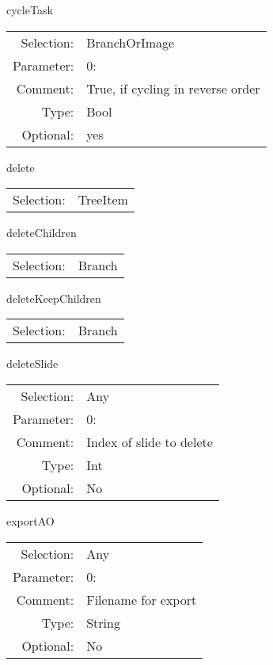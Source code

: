 \item cycleTask\\
\begin{tabular}{rl}
  Selection: & BranchOrImage\\
   Parameter: &  0:\\
        Comment: & True, if cycling in reverse order\\
           Type: & Bool\\
       Optional: &  yes\\
\end{tabular}

\item delete\\
\begin{tabular}{rl}
  Selection: & TreeItem\\
\end{tabular}

\item deleteChildren\\
\begin{tabular}{rl}
  Selection: & Branch\\
\end{tabular}

\item deleteKeepChildren\\
\begin{tabular}{rl}
  Selection: & Branch\\
\end{tabular}

\item deleteSlide\\
\begin{tabular}{rl}
  Selection: & Any\\
   Parameter: &  0:\\
        Comment: & Index of slide to delete\\
           Type: & Int\\
       Optional: &  No\\
\end{tabular}

\item exportAO\\
\begin{tabular}{rl}
  Selection: & Any\\
   Parameter: &  0:\\
        Comment: & Filename for export\\
           Type: & String\\
       Optional: &  No\\
\end{tabular}

